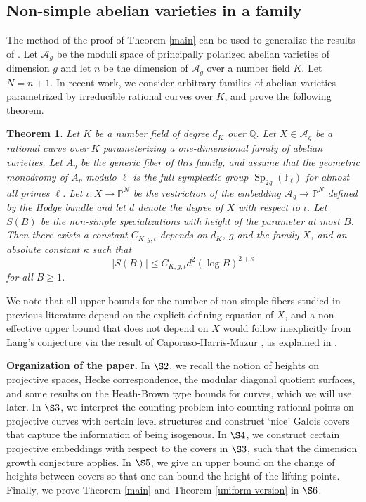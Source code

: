 \documentclass[12pt]{amsart}
\newtheorem{thm}{Theorem}[section]
\theoremstyle{definition}
\theoremstyle{remark}
\numberwithin{equation}{section}
\newcommand{\F}{\mathbb{F}}
\newcommand{\A}{\mathcal{A}_g}
\begin{document}
\subsection*{Non-simple abelian varieties in a family}
The method of the proof of Theorem \ref{main} can be used to generalize the results of \cite[Theorem B]{EEHK09}. Let $\mathcal{A}_{g}$ be the moduli space of principally polarized abelian varieties of dimension $g$ and let $n$ be the dimension of $\A$ over a number field $K$. Let $N=n+1$. In recent work, we consider arbitrary families of abelian varieties parametrized by irreducible rational curves over $K$, and prove the following theorem.
\begin{thm}\cite[Theorem 1.4]{FuNonsimple}
	Let $K$ be a number field of degree $d_K$ over $\mathbb{Q}$. Let $X \in \A$ be a rational curve over $K$ parameterizing a one-dimensional family of abelian varieties. Let $A_\eta$ be the generic fiber of this family, and assume that the geometric monodromy of $A_\eta$ modulo $\ell$ is the full symplectic group $\operatorname{Sp}_{2g}(\F_\ell)$ for almost all primes $\ell$. Let $\iota \colon X \to \mathbb{P}^N$ be the restriction of the embedding $\mathcal{A}_g \to \mathbb{P}^N$ defined by the Hodge bundle and let $d$ denote the degree of $X$ with respect to $\iota$. Let $S(B)$ be the non-simple specializations with height of the parameter at most $B$. Then there exists a constant $C_{K,g, \iota}$ depends on $d_K$, $g$ and the family $X$, and an absolute constant $\kappa$ such that $$\vert S(B) \vert  \le C_{K,g,\iota}d^2(\log B)^{2+\kappa}$$ for all $B \ge 1$. 
  
\end{thm}
We note that all upper bounds for the number of non-simple fibers studied in previous literature depend on the explicit defining equation of $X$, and a non-effective upper bound that does not depend on $X$ would follow inexplicitly from Lang's conjecture via the result of Caporaso-Harris-Mazur \cite{CHM}, as explained in \cite{EEHK09}. 

 
 \vspace{1em}

\noindent \textbf{Organization of the paper.} In $\S 2$, we recall the notion of heights on projective spaces, Hecke correspondence, the modular diagonal quotient surfaces, and some results on the Heath-Brown type bounds for curves, which we will use later. In $\S 3$, we interpret the counting problem into counting rational points on projective curves with certain level structures and construct `nice' Galois covers that capture the information of being isogenous. In $\S 4$, we construct certain projective embeddings with respect to the covers in $\S 3$, such that the dimension growth conjecture applies. In $\S 5$, we give an upper bound on the change of heights between covers so that one can bound the height of the lifting points. Finally, we prove Theorem \ref{main} and Theorem \ref{uniform version} in $\S 6$.
\end{document}
